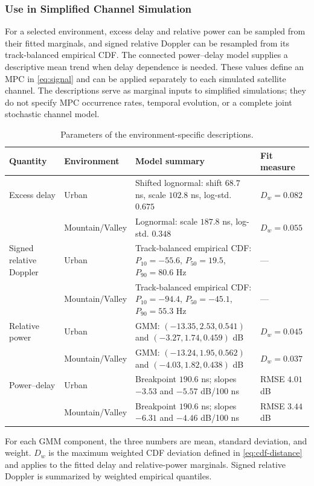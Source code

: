 \documentclass[conference]{IEEEtran}
\begin{document}
\subsubsection{Use in Simplified Channel Simulation}
For a selected environment, excess delay and relative power can be sampled from their fitted marginals, and signed relative Doppler can be resampled from its track-balanced empirical CDF. The connected power--delay model supplies a descriptive mean trend when delay dependence is needed. These values define an MPC in \eqref{eq:signal} and can be applied separately to each simulated satellite channel. The descriptions serve as marginal inputs to simplified simulations; they do not specify MPC occurrence rates, temporal evolution, or a complete joint stochastic channel model.

\begin{table}[!b]
\centering
\caption{Parameters of the environment-specific descriptions.}
\label{tab:model-parameters}
\scriptsize
\setlength{\tabcolsep}{3pt}
\begin{tabularx}{0.98\textwidth}{llXl}
\toprule
Quantity & Environment & Model summary & Fit measure\\
\midrule
Excess delay & Urban & Shifted lognormal: shift $68.7$ ns, scale $102.8$ ns, log-std. $0.675$ & $D_w=0.082$\\
& Mountain/Valley & Lognormal: scale $187.8$ ns, log-std. $0.348$ & $D_w=0.055$\\
Signed relative Doppler & Urban & Track-balanced empirical CDF: $P_{10}=-55.6$, $P_{50}=19.5$, $P_{90}=80.6$ Hz & ---\\
& Mountain/Valley & Track-balanced empirical CDF: $P_{10}=-94.4$, $P_{50}=-45.1$, $P_{90}=55.3$ Hz & ---\\
Relative power & Urban & GMM: $(-13.35,2.53,0.541)$ and $(-3.27,1.74,0.459)$ dB & $D_w=0.045$\\
& Mountain/Valley & GMM: $(-13.24,1.95,0.562)$ and $(-4.03,1.82,0.438)$ dB & $D_w=0.037$\\
Power--delay & Urban & Breakpoint $190.6$ ns; slopes $-3.53$ and $-5.57$ dB/100 ns & RMSE $4.01$ dB\\
& Mountain/Valley & Breakpoint $190.6$ ns; slopes $-6.31$ and $-4.46$ dB/100 ns & RMSE $3.44$ dB\\
\bottomrule
\end{tabularx}
\vspace{-1mm}
\parbox{0.98\textwidth}{\scriptsize For each GMM component, the three numbers are mean, standard deviation, and weight. $D_w$ is the maximum weighted CDF deviation defined in \eqref{eq:cdf-distance} and applies to the fitted delay and relative-power marginals. Signed relative Doppler is summarized by weighted empirical quantiles.}
\end{table}
\end{document}
